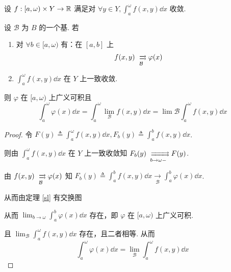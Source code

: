 \begin{property}
    设 $f:[a,\omega)\times Y\to\mathbb{R}$ 满足对 $\forall y\in Y,\displaystyle\int_a^\omega f(x,y)\dd x$ 收敛.

    设 $\mathcal{B}$ 为 $B$ 的一个基. 若

    \begin{enumerate}
        \item 对 $\forall b\in[a,\omega)$ 有：在 $[a,b]$ 上
$$
f(x,y)\xrightrightarrows[\mathcal{B}]{}{\varphi(x)}
$$

        \item $\displaystyle\int_a^\omega f(x,y)\dd x$ 在 $Y$ 上一致收敛.
    \end{enumerate}

    则 $\varphi$ 在 $[a,\omega)$ 上广义可积且
$$
\int_a^\omega\varphi(x)\dd x=\int_a^\omega\lim_{\mathcal{B}}f(x,y)\dd x=\lim{\mathcal{B}}\int_a^\omega f(x,y)\dd x
$$
\end{property}
\begin{proof}
    令 $F(y)\triangleq\displaystyle\int_a^\omega f(x,y)\dd x,F_b(y)\triangleq\int_a^bf(x,y)\dd x$.

    则由 $\displaystyle\int_a^\omega f(x,y)\dd x$ 在 $Y$ 上一致收敛知 $F_b(y)\xrightrightarrows[b\to\omega-]{} F(y)$.

    由 $f(x,y)\xrightrightarrows[\mathcal{B}]{}\varphi(x)$ 知 $F_b(y)\triangleq\displaystyle\int_a^bf(x,y)\dd x\xrightarrow[\mathcal{B}]{}\int_a^b\varphi(x)\dd x$.

    从而由定理 \ref{sl} 有交换图
    
    \begin{center}
    \end{center}

    从而 $\displaystyle\lim_{b\to\omega}\int_a^b\varphi(x)\dd x$ 存在，即 $\varphi$ 在 $[a,\omega)$ 上广义可积.

    且 $\displaystyle\lim_{\mathcal{B}}\int_a^\omega f(x,y)\dd x$ 存在，且二者相等. 从而
$$
\int_a^\omega\varphi(x)\dd x=\lim_{\mathcal{B}}\int_a^\omega f(x,y)\dd x
$$
\end{proof}


